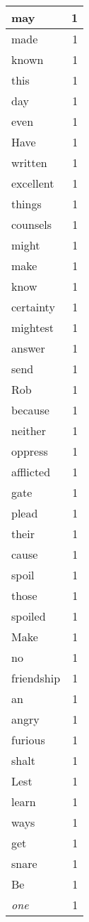 \begin{center}
\begin{longtable}{l|r}
may & 1\\ \hline 
made & 1\\ \hline 
known & 1\\ \hline 
this & 1\\ \hline 
day & 1\\ \hline 
even & 1\\ \hline 
Have & 1\\ \hline 
written & 1\\ \hline 
excellent & 1\\ \hline 
things & 1\\ \hline 
counsels & 1\\ \hline 
might & 1\\ \hline 
make & 1\\ \hline 
know & 1\\ \hline 
certainty & 1\\ \hline 
mightest & 1\\ \hline 
answer & 1\\ \hline 
send & 1\\ \hline 
Rob & 1\\ \hline 
because & 1\\ \hline 
neither & 1\\ \hline 
oppress & 1\\ \hline 
afflicted & 1\\ \hline 
gate & 1\\ \hline 
plead & 1\\ \hline 
their & 1\\ \hline 
cause & 1\\ \hline 
spoil & 1\\ \hline 
those & 1\\ \hline 
spoiled & 1\\ \hline 
Make & 1\\ \hline 
no & 1\\ \hline 
friendship & 1\\ \hline 
an & 1\\ \hline 
angry & 1\\ \hline 
furious & 1\\ \hline 
shalt & 1\\ \hline 
Lest & 1\\ \hline 
learn & 1\\ \hline 
ways & 1\\ \hline 
get & 1\\ \hline 
snare & 1\\ \hline 
Be & 1\\ \hline 
\emph{one} & 1\\ \hline 

\end{longtable}
\end{center}

